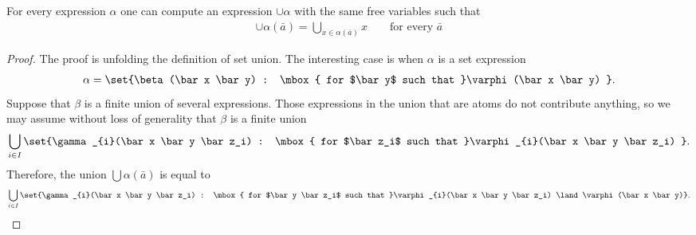  \begin{lemma}\label{lem:}
 	For every expression $\alpha$ one can compute an expression $\cup \alpha$ with the same free variables such that 
	\begin{align*}
		\cup \alpha(\bar a) = \bigcup_{x \in \alpha(\bar a)} x \qquad \mbox{for every $\bar a$}
	\end{align*}
 \end{lemma}
 \begin{proof}
	 The proof is unfolding the definition of set union.
The interesting case is when $\alpha$ is a set expression\begin{align*}
 \alpha = \set{\beta(\bar x \bar y) : \mbox{ for $\bar y$ such that }\varphi(\bar x \bar y) }.
\end{align*}
Suppose that $\beta$ is a finite union of several expressions. Those expressions in the union that are atoms do not contribute anything, so we may assume without loss of generality that $\beta$ is a finite union
\begin{align*}
	\bigcup_{i \in I} \set{\gamma_{i}(\bar x \bar y \bar z_i) : \mbox{ for $\bar z_i$ such that }\varphi_{i}(\bar x \bar y \bar z_i) }.
\end{align*}
Therefore, the union $\bigcup \alpha(\bar a)$ is equal to
\begin{align*}
	\bigcup_{i \in I} \set{\gamma_{i}(\bar x \bar y \bar z_i) : \mbox{ for $\bar y \bar z_i$ such that }\varphi_{i}(\bar x \bar y \bar z_i) \land \varphi(\bar x \bar y)}.
\end{align*} 	
 \end{proof}
 
